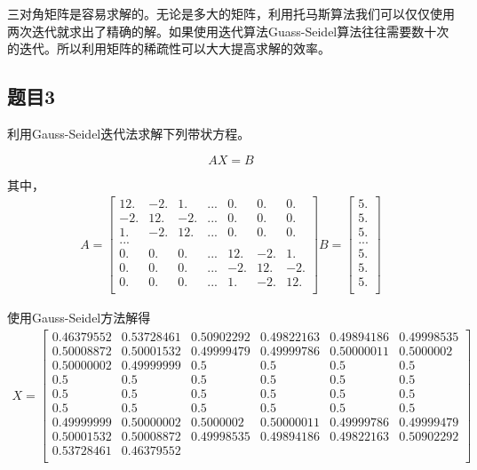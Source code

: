 三对角矩阵是容易求解的。无论是多大的矩阵，利用托马斯算法我们可以仅仅使用两次迭代就求出了精确的解。如果使用迭代算法Guass-Seidel算法往往需要数十次的迭代。所以利用矩阵的稀疏性可以大大提高求解的效率。

\subsection{题目3}

利用Gauss-Seidel迭代法求解下列带状方程。

\[AX = B\]

其中，
\begin{align*}
A = \begin{bmatrix}
12. & -2. & 1. & ... & 0. & 0. & 0.\\
-2. & 12. & -2. & ... & 0. & 0. & 0.\\
1. & -2. & 12. & ... & 0. & 0. & 0.\\
...\\
0. & 0. & 0. & ... & 12. & -2. & 1.\\
0. & 0. & 0. & ... & -2. & 12. & -2.\\
0. & 0. & 0. & ... & 1. & -2. & 12.\\
\end{bmatrix}
B = \begin{bmatrix} 5.\\5.\\5.\\...\\5.\\5.\\5.\\ \end{bmatrix}
\end{align*}

使用Gauss-Seidel方法解得
\begin{align*}
X = \begin{bmatrix}
0.46379552 & 0.53728461 & 0.50902292 & 0.49822163 & 0.49894186 & 0.49998535\\
0.50008872 & 0.50001532 & 0.49999479 & 0.49999786 & 0.50000011 & 0.5000002\\
0.50000002 & 0.49999999 & 0.5 & 0.5 & 0.5 & 0.5\\
0.5 & 0.5 & 0.5 & 0.5 & 0.5 & 0.5\\
0.5 & 0.5 & 0.5 & 0.5 & 0.5 & 0.5\\
0.5 & 0.5 & 0.5 & 0.5 & 0.5 & 0.5\\
0.49999999 & 0.50000002 & 0.5000002 & 0.50000011 & 0.49999786 & 0.49999479\\
0.50001532 & 0.50008872 & 0.49998535 & 0.49894186 & 0.49822163 & 0.50902292\\
0.53728461 & 0.46379552\\
\end{bmatrix}
\end{align*}

